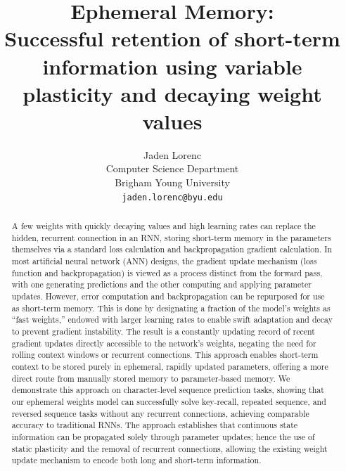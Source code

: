 \documentclass{article} %
\title{Ephemeral Memory: \\ Successful retention of short-term information using variable plasticity and decaying weight values}
\author{
  Jaden Lorenc \\
  Computer Science Department \\
  Brigham Young University \\
  \texttt{jaden.lorenc@byu.edu}
}
\begin{document}
\maketitle





\maketitle

\begin{abstract}
A few weights with quickly decaying values and high learning rates can replace the hidden, recurrent connection in an RNN, storing short-term memory in the parameters themselves via a standard loss calculation and backpropagation gradient calculation. In most artificial neural network (ANN) designs, the gradient update mechanism (loss function and backpropagation) is viewed as a process distinct from the forward pass, with one generating predictions and the other computing and applying parameter updates. However, error computation and backpropagation can be repurposed for use as short-term memory. This is done by designating a fraction of the model’s weights as “fast weights,” endowed with larger learning rates to enable swift adaptation and decay to prevent gradient instability. The result is a constantly updating record of recent gradient updates directly accessible to the network’s weights, negating the need for rolling context windows or recurrent connections. This approach enables short-term context to be stored purely in ephemeral, rapidly updated parameters, offering a more direct route from manually stored memory to parameter-based memory. We demonstrate this approach on character-level sequence prediction tasks, showing that our ephemeral weights model can successfully solve key-recall, repeated sequence, and reversed sequence tasks without any recurrent connections, achieving comparable accuracy to traditional RNNs. The approach establishes that continuous state information can be propagated solely through parameter updates; hence the use of static plasticity and the removal of recurrent connections, allowing the existing weight update mechanism to encode both long and short-term information.
\end{abstract}
\end{document}
